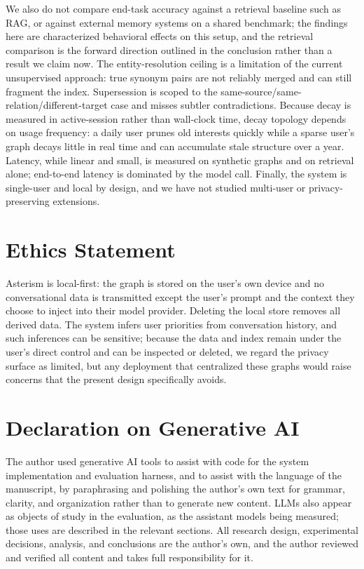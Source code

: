 \documentclass[11pt]{article}
\begin{document}
We also do not compare end-task accuracy against a retrieval baseline such as RAG, or against external memory systems on a shared benchmark; the findings here are characterized behavioral effects on this setup, and the retrieval comparison is the forward direction outlined in the conclusion rather than a result we claim now. The entity-resolution ceiling is a limitation of the current unsupervised approach: true synonym pairs are not reliably merged and can still fragment the index. Supersession is scoped to the same-source/same-relation/different-target case and misses subtler contradictions. Because decay is measured in active-session rather than wall-clock time, decay topology depends on usage frequency: a daily user prunes old interests quickly while a sparse user's graph decays little in real time and can accumulate stale structure over a year. Latency, while linear and small, is measured on synthetic graphs and on retrieval alone; end-to-end latency is dominated by the model call. Finally, the system is single-user and local by design, and we have not studied multi-user or privacy-preserving extensions.

\section*{Ethics Statement}

Asterism is local-first: the graph is stored on the user's own device and no conversational data is transmitted except the user's prompt and the context they choose to inject into their model provider. Deleting the local store removes all derived data. The system infers user priorities from conversation history, and such inferences can be sensitive; because the data and index remain under the user's direct control and can be inspected or deleted, we regard the privacy surface as limited, but any deployment that centralized these graphs would raise concerns that the present design specifically avoids.

\section*{Declaration on Generative AI}

The author used generative AI tools to assist with code for the system implementation and evaluation harness, and to assist with the language of the manuscript, by paraphrasing and polishing the author's own text for grammar, clarity, and organization rather than to generate new content. LLMs also appear as objects of study in the evaluation, as the assistant models being measured; those uses are described in the relevant sections. All research design, experimental decisions, analysis, and conclusions are the author's own, and the author reviewed and verified all content and takes full responsibility for it.
\end{document}
